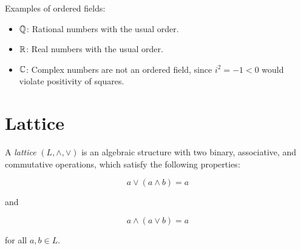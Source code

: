 Examples of ordered fields:

\begin{itemize}

	\item \( \mathbb{Q} \): Rational numbers with the usual order.

	\item \( \mathbb{R} \): Real numbers with the usual order.

	\item \( \mathbb{C} \): Complex numbers are not an ordered field, since \( i^2 = -1 < 0 \)
	      would violate positivity of squares.

\end{itemize}

\section{Lattice}

A \emph{lattice} \((L, \land, \lor)\) is an algebraic structure with two binary, associative, and commutative operations, which satisfy
the following properties:

\[
	a \lor (a \land b) = a
\]

and

\[
	a \land (a \lor b) = a
\]

for all \(a,b \in L\).



